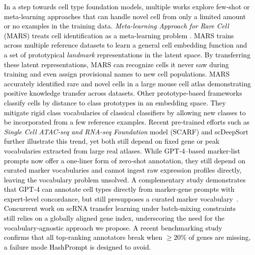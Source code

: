 \documentclass{article}
\newcommand{\gpt}[1]{\textcolor{black}{#1}}
\begin{document}
\gpt{
In a step towards cell type foundation models, multiple works explore few-shot or meta-learning approaches that can handle novel cell   from only a limited amount or no examples in the training data. \textit{Meta-learning Approach for Rare Cell  } (MARS) treats cell identification as a meta-learning problem \cite{brbic2020mars}. MARS trains across multiple reference datasets to learn a general cell embedding function and a set of prototypical \textit{landmark} representations in the latent space. By transferring these latent representations, MARS can recognize cells it never saw during training and even assign provisional names to new cell populations. MARS accurately identified rare and novel cells in a large mouse cell atlas demonstrating positive knowledge transfer across datasets. Other prototype-based frameworks \cite{snell2017prototypical} classify cells by distance to class prototypes in an embedding space. They mitigate rigid class vocabularies of classical classifiers by allowing new classes to be incorporated from a few reference examples.
Recent pre‑trained efforts such as \textit{Single Cell ATAC-seq and RNA-seq Foundation} model (SCARF) \cite{liu2025scarf} and scDeepSort \cite{shao2021scdeepsort} further illustrate this trend, yet both still depend on fixed gene or peak vocabularies extracted from large real atlases. While GPT‑4–based marker‑list prompts now offer a one‑liner form of zero‑shot annotation, they still depend on curated marker vocabularies and cannot ingest raw expression profiles directly, leaving the vocabulary problem unsolved. A complementary study demonstrates that GPT‑4 can annotate cell types directly from marker‑gene prompts with expert‑level concordance, but still presupposes a curated marker vocabulary \cite{hou2024assessing}.
Concurrent work on scRNA transfer learning under batch‑mixing constraints \cite{yang2025mixmatch} still relies on a globally aligned gene index, underscoring the need for the vocabulary‑agnostic approach we propose. A recent benchmarking study \cite{smith2024benchmark} confirms that all top‑ranking annotators break when $\geq20\%$ of genes are missing, a failure mode HashPrompt is designed to avoid.
}

\end{document}
